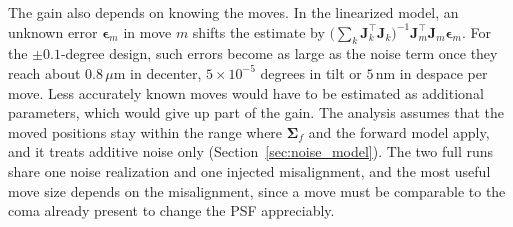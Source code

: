 The gain also depends on knowing the moves. In the linearized model, an unknown error $\boldsymbol{\epsilon}_m$ in move $m$ shifts the estimate by $\bigl(\sum_{k}\mathbf{J}_k^{\top}\mathbf{J}_k\bigr)^{-1}\mathbf{J}_m^{\top}\mathbf{J}_m\boldsymbol{\epsilon}_m$. For the $\pm0.1$-degree design, such errors become as large as the noise term once they reach about $0.8\,\mu\mathrm{m}$ in decenter, $5\times10^{-5}$ degrees in tilt or $5$\,nm in despace per move. Less accurately known moves would have to be estimated as additional parameters, which would give up part of the gain. The analysis assumes that the moved positions stay within the range where $\boldsymbol{\Sigma}_f$ and the forward model apply, and it treats additive noise only (Section~\ref{sec:noise_model}). The two full runs share one noise realization and one injected misalignment, and the most useful move size depends on the misalignment, since a move must be comparable to the coma already present to change the PSF appreciably.

%
%
%
%
